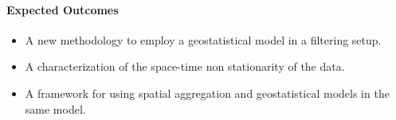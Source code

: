 \paragraph{Expected Outcomes}

\begin{itemize}

\item A new methodology to employ a geostatistical model in a filtering setup.

\item A characterization of the space-time non stationarity of the data.

\item A framework for using spatial aggregation and geostatistical models in
the same model.

\end{itemize}
